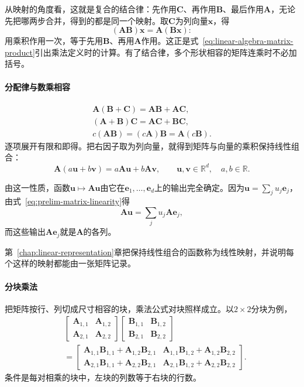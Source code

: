 从映射的角度看，这就是复合的结合律：先作用$\bm C$、再作用$\bm B$、最后作用$\bm A$，无论先把哪两步合并，得到的都是同一个映射。取$\bm C$为列向量$\bm x$，得
\[
 (\bm A\bm B)\bm x=\bm A(\bm B\bm x):
\]
用乘积作用一次，等于先用$\bm B$、再用$\bm A$作用。这正是式~\eqref{eq:linear-algebra-matrix-product}引出乘法定义时的计算。有了结合律，多个形状相容的矩阵连乘时不必加括号。

\paragraph{分配律与数乘相容}
\[
 \begin{gathered}
\bm A(\bm B+\bm C)=\bm A\bm B+\bm A\bm C,\\
(\bm A+\bm B)\bm C=\bm A\bm C+\bm B\bm C,\\
c(\bm A\bm B)=(c\bm A)\bm B=\bm A(c\bm B).
 \end{gathered}
\]
逐项展开有限和即得。把右因子取为列向量，就得到矩阵与向量的乘积保持线性组合：
\begin{equation}
\bm A(a\bm u+b\bm v)=a\bm A\bm u+b\bm A\bm v,\qquad
\bm u,\bm v\in\mathbb R^d,\quad a,b\in\mathbb R.
\label{eq:prelim-matrix-linearity}
\end{equation}

由这一性质，函数$\bm u\mapsto\bm A\bm u$由它在$\bm e_1,\ldots,\bm e_d$上的输出完全确定。因为$\bm u=\sum_ju_j\bm e_j$，由式~\eqref{eq:prelim-matrix-linearity}得
\[
 \bm A\bm u=\sum_ju_j\bm A\bm e_j,
\]
而这些输出$\bm A\bm e_j$就是$\bm A$的各列。

第~\ref{chap:linear-representation}章把保持线性组合的函数称为线性映射，并说明每个这样的映射都能由一张矩阵记录。

\paragraph{分块乘法}
把矩阵按行、列切成尺寸相容的块，乘法公式对块照样成立。以$2\times2$分块为例，
\[
 \begin{aligned}
 &\begin{bmatrix}\bm A_{1,1}&\bm A_{1,2}\\\bm A_{2,1}&\bm A_{2,2}\end{bmatrix}
 \begin{bmatrix}\bm B_{1,1}&\bm B_{1,2}\\\bm B_{2,1}&\bm B_{2,2}\end{bmatrix}\\
 &=\begin{bmatrix}
  \bm A_{1,1}\bm B_{1,1}+\bm A_{1,2}\bm B_{2,1}&\bm A_{1,1}\bm B_{1,2}+\bm A_{1,2}\bm B_{2,2}\\
  \bm A_{2,1}\bm B_{1,1}+\bm A_{2,2}\bm B_{2,1}&\bm A_{2,1}\bm B_{1,2}+\bm A_{2,2}\bm B_{2,2}
 \end{bmatrix}.
 \end{aligned}
\]
条件是每对相乘的块中，左块的列数等于右块的行数。

